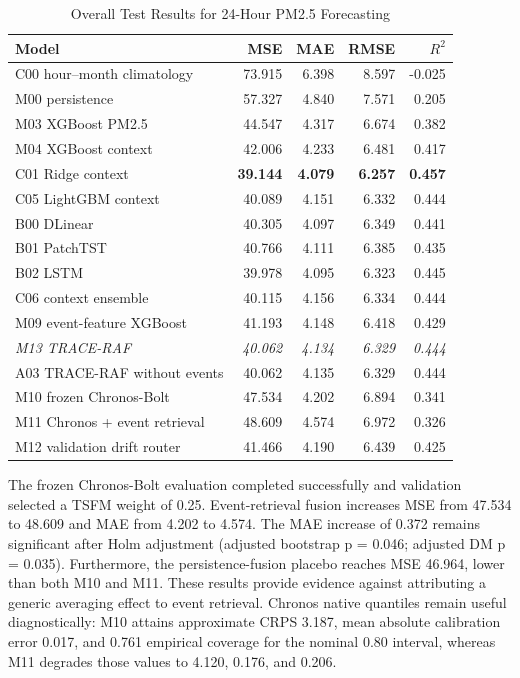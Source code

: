 \documentclass{ieeeaccess}
\begin{document}
\begin{table}[!t]
\centering
\caption{Overall Test Results for 24-Hour PM2.5 Forecasting}
\label{tab:main_results}
\begin{tabular}{lrrrr}
\toprule
Model & MSE & MAE & RMSE & $R^2$ \\
\midrule
C00 hour--month climatology & 73.915 & 6.398 & 8.597 & -0.025 \\
M00 persistence & 57.327 & 4.840 & 7.571 & 0.205 \\
M03 XGBoost PM2.5 & 44.547 & 4.317 & 6.674 & 0.382 \\
M04 XGBoost context & 42.006 & 4.233 & 6.481 & 0.417 \\
C01 Ridge context & \textbf{39.144} & \textbf{4.079} & \textbf{6.257} & \textbf{0.457} \\
C05 LightGBM context & 40.089 & 4.151 & 6.332 & 0.444 \\
B00 DLinear & 40.305 & 4.097 & 6.349 & 0.441 \\
B01 PatchTST & 40.766 & 4.111 & 6.385 & 0.435 \\
B02 LSTM & 39.978 & 4.095 & 6.323 & 0.445 \\
C06 context ensemble & 40.115 & 4.156 & 6.334 & 0.444 \\
M09 event-feature XGBoost & 41.193 & 4.148 & 6.418 & 0.429 \\
\emph{M13 TRACE-RAF} & \emph{40.062} & \emph{4.134} & \emph{6.329} & \emph{0.444} \\
A03 TRACE-RAF without events & 40.062 & 4.135 & 6.329 & 0.444 \\
M10 frozen Chronos-Bolt & 47.534 & 4.202 & 6.894 & 0.341 \\
M11 Chronos + event retrieval & 48.609 & 4.574 & 6.972 & 0.326 \\
M12 validation drift router & 41.466 & 4.190 & 6.439 & 0.425 \\
\bottomrule
\end{tabular}
\end{table}

The frozen Chronos-Bolt evaluation completed successfully and validation selected a TSFM weight of 0.25. Event-retrieval fusion increases MSE from 47.534 to 48.609 and MAE from 4.202 to 4.574. The MAE increase of 0.372 remains significant after Holm adjustment (adjusted bootstrap p = 0.046; adjusted DM p = 0.035). Furthermore, the persistence-fusion placebo reaches MSE 46.964, lower than both M10 and M11. These results provide evidence against attributing a generic averaging effect to event retrieval. Chronos native quantiles remain useful diagnostically: M10 attains approximate CRPS 3.187, mean absolute calibration error 0.017, and 0.761 empirical coverage for the nominal 0.80 interval, whereas M11 degrades those values to 4.120, 0.176, and 0.206.
\end{document}
